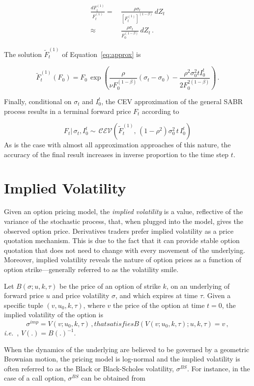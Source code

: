 \documentclass[12pt,oneside]{article}
\newcommand{\beqn}{\begin{equation}}
\newcommand{\eeqn}{\end{equation}}
\numberwithin{equation}{section}
\newcommand{\ie}{{\em i.e.}\ }
\begin{document}
\beqn\label{eq:approx}
\begin{aligned}
\frac{dF_t^{(1)}}{F_t^{(1)}}=&\,\frac{\rho\sigma_t}{[F_t^{(1)}]^{(1-\beta)}}\,dZ_t\\[5pt]
\approx&\,\frac{\rho\sigma_t}{F_0^{(1-\beta)}}\,dZ_t\,.
\end{aligned}
\eeqn

The solution $\tilde{F}_t^{(1)}$ of Equation~\eqref{eq:approx} is

\beqn
\tilde{F}_t^{(1)}(F_0)=F_0\,\exp\left(\frac{\rho}{\nu F_0^{(1-\beta)}}(\sigma_t - \sigma_0) - 
\frac{\rho^2\sigma_0^2 t I_0^t}{2F_0^{2(1-\beta)}}\right)\,.
\eeqn

Finally, conditional on $\sigma_t$ and $I_0^t$, the CEV approximation of the general
SABR process results in a terminal forward price $F_t$ according to

\beqn
F_t|\,\sigma_t,I_0^t\sim\,\mathcal{CEV}\left(\tilde{F}_t^{(1)},\,(1-\rho^2)\sigma_0^2\, t\, I_0^t\right)
\eeqn
As is the case with almost all approximation approaches of this nature,
the accuracy of the final result increases in inverse proportion to
the time step $t$.

\section{Implied Volatility}\label{sec:ivol}
Given an option pricing model, the {\em implied
volatility} is a value, reflective of the variance of the stochastic process,
that, when plugged into the model, gives the observed option price.
Derivatives traders prefer implied volatility as a price quotation mechanism.
This is due to the fact that it can provide stable option quotation that
does not need to change with every  movement of the underlying.
Moreover, implied volatility reveals the nature of option prices as
a function of option strike---generally referred to as the volatility smile.

Let $B(\sigma;u,k,\tau)$ be the price of an option of strike $k$, on an underlying
of forward price $u$ and price volatility $\sigma$,
and which expires at time $\tau$.
Given a specific tuple $(v,u_0,k,\tau)$,
where $v$ the price of the option at time $t=0$,
the implied volatility of the option is
\begin{subequations}
\beqn
\sigma^{imp} = V(v;u_0,k,\tau)\,,
\eeqn
that satisfies
\beqn
B(V(v;u_0,k,\tau);u,k,\tau)=v\,,
\eeqn
\end{subequations}
\ie, $V(.)=B(.)^{-1}$.


When the dynamics of the underlying are believed to be governed by a
geometric Brownian motion, the pricing model is log-normal and the
implied volatility is often referred to as the Black
or Black-Scholes volatility, $\sigma^{BS}$.
For instance, in the case of a call option,
$\sigma^{BS}$ can be obtained from 
\end{document}
